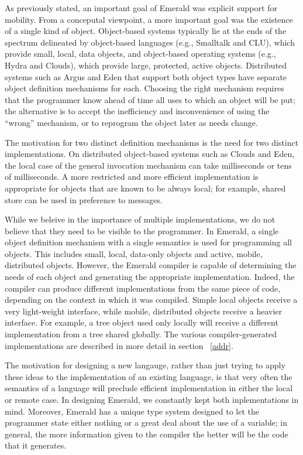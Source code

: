 As previously stated, an important goal of Emerald was explicit support
for mobility.  From a conceputal viewpoint, a more important goal
was the existence of a single kind of object.  Object-based systems
typically lie at the ends of the spectrum delineated by 
object-based languages (e.g., Smalltalk and CLU), 
which provide small, local, data objects, and
object-based operating systems (e.g., Hydra and Clouds), 
which provide large, protected, active objects.  Distributed systems such as
Argus and Eden that support both object types have separate object definition
mechanisms for each.  Choosing the right mechanism 
requires that the programmer know ahead of
time all uses to which an object will be put; the alternative is to accept
the inefficiency and inconvenience of using the ``wrong'' mechanism, 
or to reprogram the object
later as needs change.  

The motivation for two distinct definition mechanisms is the need for two
distinct implementations.  On distributed
object-based systems such as Clouds and Eden, 
the local case of the general invocation mechanism can take milliseconds or
tens of milliseconds.  A more restricted and more efficient implementation
is appropriate for objects that are known to be always local; for example,
shared store can be used in preference to messages.

While we beleive in the importance of multiple implementations, we
do not believe that they need to be visible to the programmer.  
In Emerald, a single object definition mechanism with a single semantics 
is used for programming all objects.  This includes small, local,
data-only objects and active, mobile, 
distributed objects.  
However, the Emerald compiler is capable of determining the needs
of each object and generating the appropriate implementation.
Indeed, the compiler can produce
different implementations from the same piece of code, depending
on the context in which it was compiled.
Simple local
objects receive a very light-weight interface, while mobile, distributed
objects receive a heavier interface.   For example,
a tree object used only locally will receive a different
implementation from a tree shared globally.  The various compiler-generated
implementations are described in more detail in section ~\ref{addr}.

The motivation for designing a new langauge, rather than just trying to
apply these ideas to the implementation of an existing language, is that
very often the semantics of a language will preclude efficient
implementation in either the local or remote case.  In designing Emerald,
we constantly kept both inplementations in mind.  Moreover, Emerald has a
unique type system designed to let the programmer state either nothing or a
great deal about the use of a variable; in general, the more information
given to the compiler the better will be the code that it generates.

